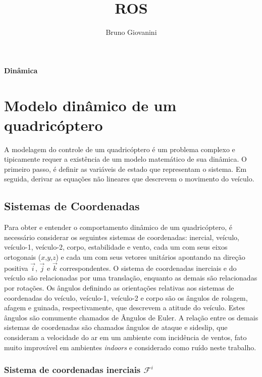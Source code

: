 \documentclass[a4paper, 12pt]{article}
\author{Bruno Giovanini}
\title{ROS}
\begin{document}
\begin{large}


\textbf{Dinâmica}

\vspace{1.5cm}


\end{large}



\newpage

	
\section{Modelo dinâmico de um quadricóptero}

 A modelagem do controle de um quadricóptero é um problema complexo e tipicamente requer a existência de um modelo matemático de sua dinâmica.
 O primeiro passo, é definir as variáveis de estado que representam o sistema. Em seguida, derivar as equações não lineares que descrevem o movimento do veículo. 

\subsection{Sistemas de Coordenadas}

Para obter e entender o comportamento dinâmico de um quadricóptero, é necessário considerar os seguintes sistemas de coordenadas: inercial, veículo, veículo-1, veículo-2, corpo, estabilidade e vento, cada um com seus eixos ortogonais ($x$,$y$,$z$) e cada um com seus vetores unitários apontando na direção positiva $\vec{i}$, $\vec{j}$ e $\vec{k}$ correspondentes. O sistema de coordenadas inerciais e do veículo são relacionadas por uma translação, enquanto as demais são relacionadas por rotações. Os ângulos definindo as orientações relativas aos sistemas de coordenadas do veículo, veículo-1, veículo-2 e corpo são os ângulos de rolagem, afagem e guinada, respectivamente, que descrevem a atitude do veículo. Estes ângulos são comumente chamados de Ângulos de Euler. A relação entre os demais sistemas de coordenadas são chamados ângulos de ataque e sideslip, que consideram a velocidade do ar em um ambiente com incidência de ventos, fato muito improvável em ambientes \textit{indoors} e considerado como ruído neste trabalho. 

\subsubsection{Sistema de coordenadas inerciais $\mathcal{F}^i$}
\end{document}
